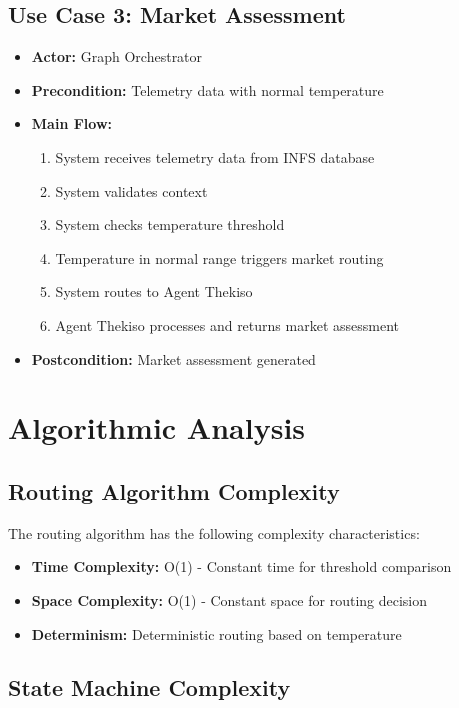 \subsection{Use Case 3: Market Assessment}

\begin{itemize}
    \item \textbf{Actor:} Graph Orchestrator
    \item \textbf{Precondition:} Telemetry data with normal temperature
    \item \textbf{Main Flow:}
    \begin{enumerate}
        \item System receives telemetry data from INFS database
        \item System validates context
        \item System checks temperature threshold
        \item Temperature in normal range triggers market routing
        \item System routes to Agent Thekiso
        \item Agent Thekiso processes and returns market assessment
    \end{enumerate}
    \item \textbf{Postcondition:} Market assessment generated
\end{itemize}

\section{Algorithmic Analysis}

\subsection{Routing Algorithm Complexity}

The routing algorithm has the following complexity characteristics:

\begin{itemize}
    \item \textbf{Time Complexity:} O(1) - Constant time for threshold comparison
    \item \textbf{Space Complexity:} O(1) - Constant space for routing decision
    \item \textbf{Determinism:} Deterministic routing based on temperature
\end{itemize}

\subsection{State Machine Complexity}


